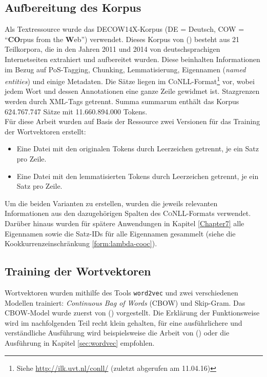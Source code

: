   \subsection{Aufbereitung des Korpus}\label{sec:corpusprep}

  Als Textressource wurde das DECOW14X-Korpus (DE = Deutsch, COW = ``\textbf{CO}rpus from the \textbf{W}eb'') verwendet.
  Dieses Korpus von (\cite{schafer2012building}) besteht aus 21 Teilkorpora,
  die in den Jahren 2011 und 2014 von deutschsprachigen Internetseiten extrahiert und aufbereitet wurden. Diese beinhalten
  Informationen im Bezug auf PoS-Tagging, Chunking, Lemmatisierung, Eigennamen (\emph{named entities}) und einige Metadaten.
  Die Sätze liegen im \textsc{CoNLL}-Format\footnote{Siehe \url{http://ilk.uvt.nl/conll/} (zuletzt abgerufen am 11.04.16)} vor,
  wobei jedem Wort und dessen Annotationen eine ganze Zeile gewidmet ist.
  Stazgrenzen werden durch XML-Tags getrennt. Summa summarum enthält das Korpus 624.767.747 Sätze mit 11.660.894.000 Tokens.\\

  Für diese Arbeit wurden auf Basis der Ressource zwei Versionen für das Training der Wortvektoren erstellt:
  \begin{itemize}
      \item Eine Datei mit den originalen Tokens durch Leerzeichen getrennt, je ein Satz pro Zeile.
      \item Eine Datei mit den lemmatisierten Tokens durch Leerzeichen getrennt, je ein Satz pro Zeile.
  \end{itemize}

  Um die beiden Varianten zu erstellen, wurden die jeweils relevanten Informationen aus den dazugehörigen Spalten des
  \textsc{CoNLL}-Formats verwendet.\\
  Darüber hinaus wurden für spätere Anwendungen in Kapitel \ref{Chapter7} alle Eigennamen sowie die Satz-IDs für
  alle Eigennamen gesammelt (siehe die Kookkurrenzeinschränkung \ref{form:lambda-cooc}).

  \subsection{Training der Wortvektoren}\label{sec:vectrain}

  Wortvektoren wurden mithilfe des Tools \verb|word2vec| und zwei verschiedenen Modellen trainiert: \emph{Continuous Bag of Words} (CBOW)
  und Skip-Gram. Das CBOW-Model wurde zuerst von (\cite{mikolov2013efficient}) vorgestellt. Die Erklärung der Funktionsweise
  wird im nachfolgenden Teil recht klein gehalten, für eine ausführlichere und verständliche Ausführung wird beispielsweise
  die Arbeit von (\cite{rong2014word2vec}) oder die Ausführung in Kapitel \ref{sec:wordvec} empfohlen.\\

